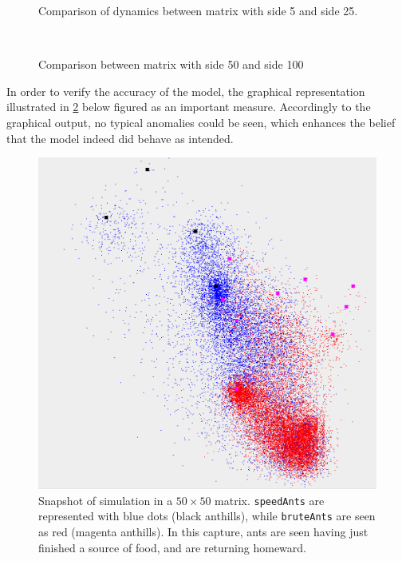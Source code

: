 \documentclass[a4paper,12pt]{article}
\theoremstyle{plain}
\theoremstyle{definition}
\begin{document}
      \begin{figure}[H]
         \vspace*{1cm}
         \hspace*{-2cm}
         \centering
         \begin{minipage}[t]{.6\textwidth}		
            \vspace{0pt}
            \centering
            \resizebox{\columnwidth}{!}{}
            \caption{Comparison of dynamics between matrix with side 5 and side
            25.}
             \label{fig:lower}
         \end{minipage}~\hspace*{1em}
         \begin{minipage}[t]{.6\textwidth}		
            \vspace{0pt}
            \centering
            \resizebox{\columnwidth}{!}{}
            \caption{Comparison between matrix with side 50 and side 100}
            \label{fig:higher}
         \end{minipage}
      \end{figure}
      
      In order to verify the accuracy of the model, the graphical representation
      illustrated in \cref{fig:graph} below figured as an important measure. Accordingly 
      to the graphical output, no typical anomalies could be seen, which enhances the 
      belief that the model indeed did behave as intended.

      \begin{figure}[H]
         \centering
         \includegraphics[width=.8\textwidth]{5050foodhunt.png}
         \caption{Snapshot of simulation in a $50 \times 50$ matrix.
            \texttt{speedAnts} are represented with blue dots (black anthills), while
            \texttt{bruteAnts} are seen as red (magenta anthills). In this capture, ants are seen
            having just finished a source of food, and are returning homeward.} 
         \label{fig:graph}            
      \end{figure}
\end{document}

